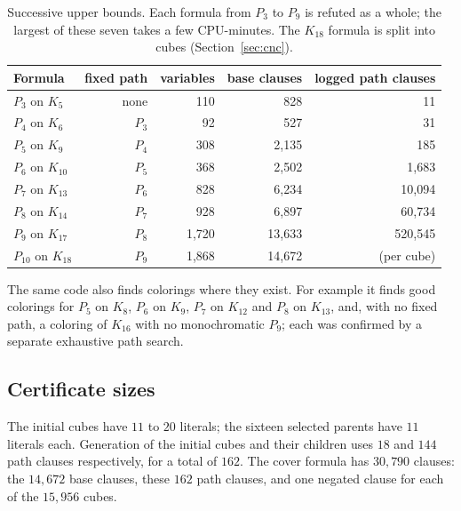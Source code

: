 \documentclass[11pt]{article}
\theoremstyle{definition}
\theoremstyle{remark}
\begin{document}
\begin{appendices}
\begin{table}[ht]
\centering
\begin{tabular}{@{}lrrrr@{}}
\toprule
Formula & fixed path & variables & base clauses & logged path clauses\\
\midrule
$P_3$ on $K_5$ & none & 110 & 828 & 11\\
$P_4$ on $K_6$ & $P_3$ & 92 & 527 & 31\\
$P_5$ on $K_9$ & $P_4$ & 308 & 2{,}135 & 185\\
$P_6$ on $K_{10}$ & $P_5$ & 368 & 2{,}502 & 1{,}683\\
$P_7$ on $K_{13}$ & $P_6$ & 828 & 6{,}234 & 10{,}094\\
$P_8$ on $K_{14}$ & $P_7$ & 928 & 6{,}897 & 60{,}734\\
$P_9$ on $K_{17}$ & $P_8$ & 1{,}720 & 13{,}633 & 520{,}545\\
$P_{10}$ on $K_{18}$ & $P_9$ & 1{,}868 & 14{,}672 & (per cube)\\
\bottomrule
\end{tabular}
\medskip
\caption{Successive upper bounds. Each formula from $P_3$ to $P_9$ is refuted as a whole;
the largest of these seven takes a few CPU-minutes. The $K_{18}$ formula is split into cubes
(Section~\ref{sec:cnc}).}\label{tab:ladder}
\end{table}

The same code also finds colorings where they exist. For example it finds
good colorings for $P_5$ on $K_8$, $P_6$ on $K_9$, $P_7$ on $K_{12}$ and
$P_8$ on $K_{13}$, and, with no fixed path, a coloring of $K_{16}$ with no
monochromatic $P_9$; each was confirmed by a separate exhaustive path
search.

\subsection{Certificate sizes}
The initial cubes have $11$ to $20$ literals; the sixteen selected parents
have $11$ literals each. Generation of the initial cubes and their
children uses $18$ and $144$ path clauses respectively, for a total of
$162$. The cover formula has $30{,}790$ clauses: the $14{,}672$ base
clauses, these $162$ path clauses, and one negated clause for each of the
$15{,}956$ cubes.

\end{appendices}
\end{document}
